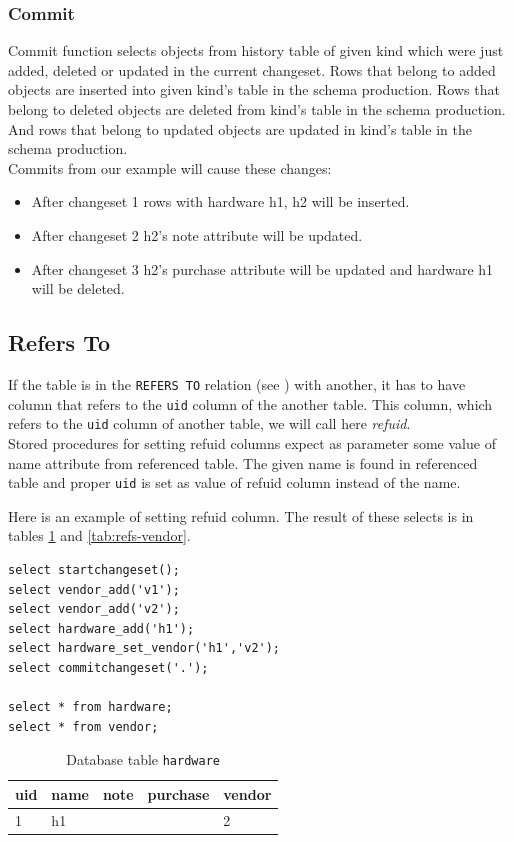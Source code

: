\documentclass[deska]{subfiles}
\begin{document}
\subsubsection{Commit}
Commit function selects objects from history table of given kind which were just added, deleted or updated in the current changeset. Rows that belong to added objects are inserted into given kind's table in the schema production. Rows that belong to deleted objects are deleted from kind's table in the schema production. And rows that belong to updated objects are updated in kind's table in the schema production.\\
Commits from our example will cause these changes:
\begin{itemize}
    \item After changeset 1 rows with hardware h1, h2 will be inserted.
    \item After changeset 2 h2's note attribute will be updated.
    \item After changeset 3 h2's purchase attribute will be updated and hardware h1 will be deleted.
\end{itemize}

\subsection{Refers To}
\label{sec:db-refs-to}
If the table is in the {\tt REFERS TO} relation (see ) with another, it has to have column that refers to the {\tt uid} column of the another table. This column, which refers to the {\tt uid} column of another table, we will call here {\em refuid}.\\
Stored procedures for setting refuid columns expect as parameter some value of name attribute from referenced table. The given name is found in referenced table and proper {\tt uid} is set as value of refuid column instead of the name.

Here is an example of setting refuid column. The result of these selects is in tables \ref{tab:refs-hardware} and  \ref{tab:refs-vendor}.
\begin{verbatim}
select startchangeset();
select vendor_add('v1');
select vendor_add('v2');
select hardware_add('h1');
select hardware_set_vendor('h1','v2');
select commitchangeset('.');

select * from hardware;
select * from vendor;
\end{verbatim}

\begin{longtable}{ l | l | l | l | l }
    \caption{Database table {\tt hardware}}\\
    uid & name & note & purchase & vendor\\
    \hline
    \endhead
\label{tab:refs-hardware}
    1 & h1 &  &  & 2\\
    \hline
\end{longtable}
\end{document}
